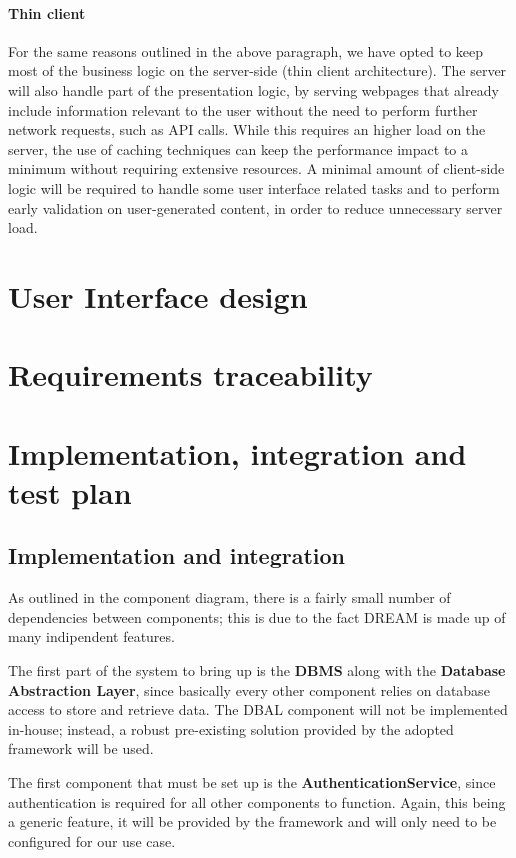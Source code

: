 \documentclass{article}
\begin{document}
\paragraph{Thin client}
For the same reasons outlined in the above paragraph, we have opted to keep most of the business logic on the server-side (thin client architecture). The server will also handle part of the presentation logic, by serving webpages that already include information relevant to the user without the need to perform further network requests, such as API calls. While this requires an higher load on the server, the use of caching techniques can keep the performance impact to a minimum without requiring extensive resources.
A minimal amount of client-side logic will be required to handle some user interface related tasks and to perform early validation on user-generated content, in order to reduce unnecessary server load.

\newpage
\section{User Interface design}
\newpage
\section{Requirements traceability}
\newpage
\section{Implementation, integration and test plan}
\subsection{Implementation and integration}
\setlength{\parskip}{.5em}
As outlined in the component diagram, there is a fairly small number of dependencies between components; this is due to the fact DREAM is made up of many indipendent features.

\par The first part of the system to bring up is the \textbf{DBMS} along with the \textbf{Database Abstraction Layer}, since basically every other component relies on database access to store and retrieve data. The DBAL component will not be implemented in-house; instead, a robust pre-existing solution provided by the adopted framework will be used.

\par The first component that must be set up is the \textbf{AuthenticationService}, since authentication is required for all other components to function. Again, this being a generic feature, it will be provided by the framework and will only need to be configured for our use case.
\end{document}
